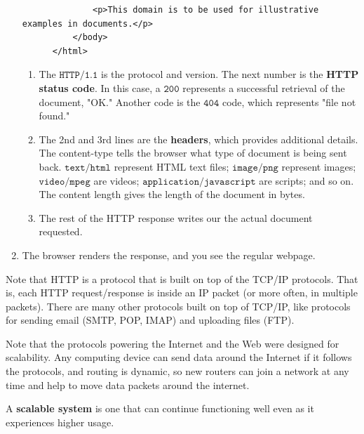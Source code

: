 \documentclass{article}
\begin{document}
\begin{enumerate}
\begin{lstlisting}
              <p>This domain is to be used for illustrative examples in documents.</p>
          </body>
      </html>
      \end{lstlisting}
      \begin{enumerate}
          \item The $\texttt{HTTP/1.1}$ is the protocol and version. The next number is the \textbf{HTTP status code}. In this case, a $\texttt{200}$ represents a successful retrieval of the document, "OK." Another code is the $\texttt{404}$ code, which represents "file not found."
          \item The 2nd and 3rd lines are the \textbf{headers}, which provides additional details. The content-type tells the browser what type of document is being sent back. $\texttt{text/html}$ represent HTML text files; $\texttt{image/png}$ represent images; $\texttt{video/mpeg}$ are videos; $\texttt{application/javascript}$ are scripts; and so on. The content length gives the length of the document in bytes. 
          \item The rest of the HTTP response writes our the actual document requested. 
      \end{enumerate}
      \item The browser renders the response, and you see the regular webpage. 
  \end{enumerate}

  Note that HTTP is a protocol that is built on top of the TCP/IP protocols. That is, each HTTP request/response is inside an IP packet (or more often, in multiple packets). There are many other protocols built on top of TCP/IP, like protocols for sending email (SMTP, POP, IMAP) and uploading files (FTP). 

  Note that the protocols powering the Internet and the Web were designed for scalability. Any computing device can send data around the Internet if it follows the protocols, and routing is dynamic, so new routers can join a network at any time and help to move data packets around the internet.

  \begin{definition}
  A \textbf{scalable system} is one that can continue functioning well even as it experiences higher usage. 
  \end{definition}
\end{document}
